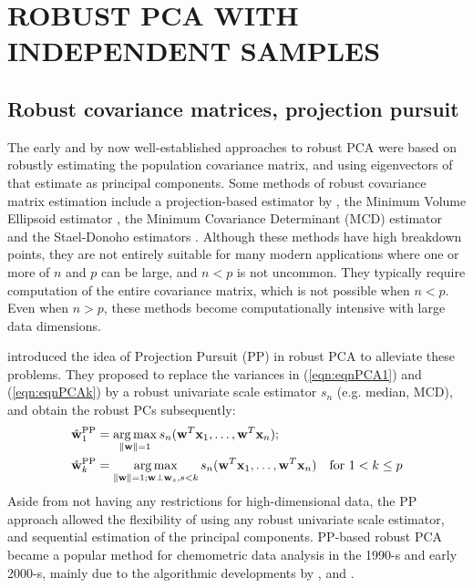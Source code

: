 \section*{\sffamily \Large ROBUST PCA WITH INDEPENDENT SAMPLES}
\label{Section:sec2}

\subsection*{\sffamily \large Robust covariance matrices, projection pursuit}

The early and by now well-established approaches to robust PCA were based on robustly estimating the population covariance matrix, and using eigenvectors of that estimate as principal components. Some methods of robust covariance matrix estimation include a projection-based estimator by \cite{maronna76}, the Minimum Volume Ellipsoid estimator \citep{Rousseeuw84},  the Minimum Covariance Determinant (MCD) estimator \citep{rousseeuw85} and the Stael-Donoho estimators \citep{MaronnaYohai95,ZuoCui05}. Although these methods have high breakdown points, they are not entirely suitable for many modern applications where one or more of $n$ and $p$ can be large, and $n < p$ is not uncommon. They typically require computation of the entire covariance matrix, which is not possible when $n < p$. Even when $n > p$, these methods become computationally intensive with large data dimensions.

\cite{LiChen85} introduced the idea of Projection Pursuit (PP) in robust PCA to alleviate these problems. They proposed to replace the variances in (\ref{eqn:eqnPCA1}) and (\ref{eqn:eqnPCAk}) by a robust univariate scale estimator $s_n$ (e.g. median, MCD), and obtain the robust PCs subsequently:
%
\begin{align*}
\hat {{\bf{w}}}_1^\text{PP} &= \operatorname*{arg\,max}_{\| {\bf{w}} \| = 1} s_n ( {\bf{w}}^T {\bf{x}}_1, \ldots, {\bf{w}}^T {\bf{x}}_n );\\
\hat {{\bf{w}}}_k^\text{PP} &= \operatorname*{arg\,max}_{\| {\bf{w}} \| = 1; {\bf{w}} \perp {\bf{w}}_s, s < k} s_n ( {\bf{w}}^T {\bf{x}}_1, \ldots, {\bf{w}}^T {\bf{x}}_n ) \quad \text{for } 1< k \leq p
\end{align*}
%
Aside from not having any restrictions for high-dimensional data, the PP approach allowed the flexibility of using any robust univariate scale estimator, and sequential estimation of the principal components. PP-based robust PCA became a popular method for chemometric data analysis in the 1990-s and early 2000-s, mainly due to the algorithmic developments by \cite{XieEtal93}, \cite{HubertEtal02} and \cite{CrouxEtal07}.

